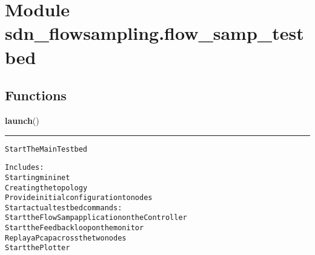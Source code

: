 %
%
%


\section{Module sdn\_flowsampling.flow\_samp\_testbed}

    \label{sdn_flowsampling:flow_samp_testbed}


  \subsection{Functions}

    \label{sdn_flowsampling:flow_samp_testbed:launch}

    \vspace{0.5ex}

\hspace{.8\funcindent}\begin{boxedminipage}{\funcwidth}

    \raggedright \textbf{launch}()

    \vspace{-1.5ex}

    \rule{\textwidth}{0.5\fboxrule}
\setlength{\parskip}{2ex}
\begin{alltt}
Start The Main Testbed

Includes:
Starting mininet
Creating the topology
Provide initial configuration to nodes
Start actual testbed commands:
    Start the FlowSamp application on the Controller
    Start the Feedback loop on the monitor
    Replay a Pcap across the two nodes
    Start the Plotter
\end{alltt}

\setlength{\parskip}{1ex}
    \end{boxedminipage}

